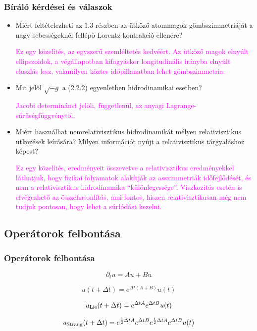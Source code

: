 \documentclass{beamer}
\begin{document}
\begin{frame}[noframenumbering]
\frametitle{Bíráló kérdései és válaszok}
\begin{itemize}
\fontsize{9}{14}\selectfont

\item Miért feltételezheti az 1.3 részben az ütköző atommagok gömbszimmetriáját a nagy sebességeknél fellépő Lorentz-kontrakció ellenére? 


\textcolor{magenta}{Ez egy közelítés, az egyszerű szemléltetés kedvéért. Az ütköző magok elnyúlt ellipszoidok, a végállapotban kifagyáskor longitudinális irányba elnyúlt eloszlás lesz, valamilyen köztes időpillanatban lehet gömbszimmetria.}

\item Mit jelöl $\sqrt{-g}$ a (2.2.2) egyenletben hidrodinamikai esetben?

\textcolor{magenta}{Jacobi determinánst jelöli, függetlenül, az anyagi Lagrange-sűrűségfüggvénytől.}

\item Miért használhat nemrelativisztikus hidrodinamikát mélyen relativisztikus ütközések leírására? Milyen információt nyújt a relativisztikus tárgyaláshoz képest?

\textcolor{magenta}{Ez egy közelítés, eredményeit összevetve a relativisztikus eredményekkel láthatjuk, hogy fizikai folyamatok alakítják az asszimmetriák időfejlődését, és nem a relativisztikus hidrodinamika ``különlegessége''. Viszkozitás esetén is elvégezhető az összehasonlítás, ami fontos, hiszen relativisztikusan még nem tudjuk pontosan, hogy lehet a súrlódást kezelni.}

\end{itemize}
\end{frame}


\subsection{Operátorok felbontása}
\begin{frame}[noframenumbering]
\frametitle{Operátorok felbontása}
\begin{large}
\begin{equation*}
\partial_t u = Au+Bu
\end{equation*}

\begin{equation*}
u(t+\Delta t)=e^{\Delta t(A+B)}u(t)
\end{equation*}


\begin{equation*}
u_{\rm{Lie}}(t+\Delta t)=e^{\Delta tA}e^{\Delta tB}u(t)
\end{equation*}

\begin{equation*}
u_{\rm{Strang}}(t+\Delta t)=e^{\frac{1}{2}\Delta tA}e^{\Delta tB}e^{\frac{1}{2}\Delta tA}e^{\Delta tB}u(t)
\end{equation*}
\end{large}
\end{frame}
\end{document}
